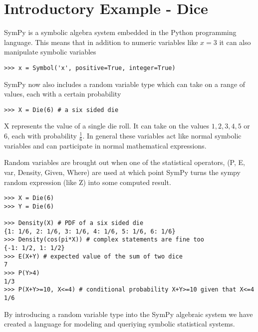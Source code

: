 \section{Introductory Example - Dice}

SymPy is a symbolic algebra system embedded in the Python programming language. This means that in addition to numeric variables like $x = 3$ it can also manipulate symbolic variables

\begin{lstlisting}
>>> x = Symbol('x', positive=True, integer=True)
\end{lstlisting}

SymPy now also includes a random variable type which can take on a range of values, each with a certain probability 

\begin{lstlisting}
>>> X = Die(6) # a six sided die
\end{lstlisting}

X represents the value of a single die roll. It can take on the values $1,2,3,4,5$ or $6$, each with probability $\frac{1}{6}$. In general these variables act like normal symbolic variables and can participate in normal mathematical expressions. 

Random variables are brought out when one of the statistical operators, (P, E, var, Density, Given, Where) are used at which point SymPy turns the sympy random expression (like Z) into some computed result. 

\begin{lstlisting}
>>> X = Die(6)
>>> Y = Die(6)

>>> Density(X) # PDF of a six sided die
{1: 1/6, 2: 1/6, 3: 1/6, 4: 1/6, 5: 1/6, 6: 1/6}
>>> Density(cos(pi*X)) # complex statements are fine too
{-1: 1/2, 1: 1/2}
>>> E(X+Y) # expected value of the sum of two dice
7
>>> P(Y>4) 
1/3
>>> P(X+Y>=10, X<=4) # conditional probability X+Y>=10 given that X<=4
1/6
\end{lstlisting}

By introducing a random variable type into the SymPy algebraic system we have created a language for modeling and queriying symbolic statistical systems. 

